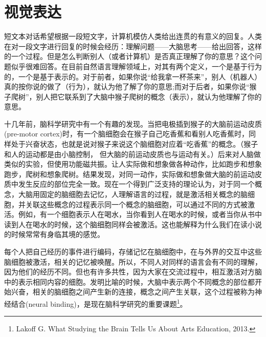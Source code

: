 \chapter{视觉表达}
短文本对话希望根据一段短文字，计算机模仿人类给出连贯的有意义的回复。人类在对一段文字进行回复的时候会经历：理解问题——大脑思考——给出回答，这样的一个过程。但是怎么判断别人（或者计算机）是否真正理解了你的意思？这个问题似乎很难回答。在目前自然语言理解领域上，对其有两个定义，一个是基于行为的，一个是基于表示的。对于前者，如果你说“给我拿一杯茶来”，别人（机器人）真的按你说的做了（行为），就认为他了解了你的意思;而对于后者，如果你说“猴子爬树”，别人把它联系到了大脑中猴子爬树的概念（表示），就认为他理解了你的意思。


十几年前，脑科学研究中有一个有趣的发现。当把电极插到猴子的大脑前运动皮质(pre-motor cortex)时，有一个脑细胞会在猴子自己吃香蕉和看别人吃香蕉时，同样处于兴奋状态，也就是说对猴子来说这个脑细胞对应着“吃香蕉”的概念。（猴子和人的运动都是由小脑控制， 但大脑的前运动皮质也与运动有关。）后来对人脑做类似的实验，但使用功能磁共振。让人实际做和想象做各种动作，比如跑步和想象跑步，爬树和想象爬树。结果发现，对同一动作，实际做和想象做大脑的前运动皮质中发生反应的部位完全一致。现在一个得到广泛支持的理论认为，对于同一个概念，大脑用固定的脑细胞去记忆，人理解语言的过程，就是激活相关概念的脑细胞，并关联这些概念的过程表示同一个概念的脑细胞，可以通过不同的方式被激活。例如，有一个细胞表示人在喝水，当你看到人在喝水的时候，或者当你从书中读到人在喝水的时候，这个脑细胞同样会被激活。这也能解释为什么我们在读小说的时候常常有身临其境的感觉。

每个人把自己经历的事件进行编码，存储记忆在脑细胞中，在与外界的交互中这些脑细胞被激活，相关的记忆被唤醒。所以，不同人对同样的语言会有不同的理解，因为他们的经历不同。但也有许多共性，因为大家在交流过程中，相互激活对方脑中的表示相同内容的细胞。发明比喻的时候，大脑中表示两个不同概念的部位都开始兴奋，相关的脑细胞之间产生新的连接，概念之间产生关联，这个过程被称为神经结合(neural binding)，是现在脑科学研究的重要课题\footnote{Lakoff G. What Studying the Brain Tells Us About Arts Education, 2013.}。

